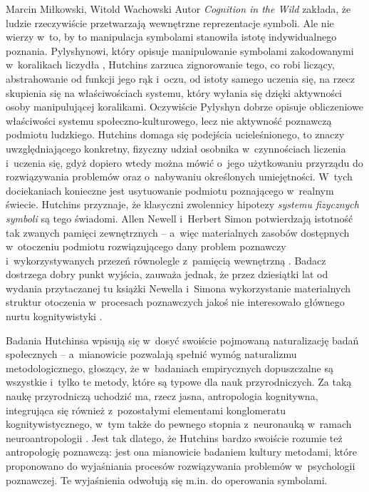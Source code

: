 \begin{artplenv2auth}{Marcin Miłkowski, Witold Wachowski}
Autor \textit{Cognition in the Wild} zakłada, że ludzie rzeczywiście przetwarzają wewnętrzne reprezentacje symboli. Ale nie wierzy w~to, by to manipulacja symbolami stanowiła istotę indywidualnego poznania. Pylyshynowi, który opisuje manipulowanie symbolami zakodowanymi w~koralikach liczydła
\parencite[][s.~56]{pylyshyn_computing_1989}, %
 Hutchins zarzuca zignorowanie tego, co robi liczący, abstrahowanie od funkcji jego rąk i~oczu, od istoty samego uczenia się, na rzecz skupienia się na właściwościach systemu, który wyłania się dzięki aktywności osoby manipulującej koralikami. Oczywiście Pylyshyn dobrze opisuje obliczeniowe właściwości systemu społeczno-kulturowego, lecz nie aktywność poznawczą podmiotu ludzkiego. Hutchins domaga się podejścia ucieleśnionego, to znaczy uwzględniającego konkretny, fizyczny udział osobnika w~czynnościach liczenia i~uczenia się, gdyż dopiero wtedy można mówić o~jego użytkowaniu przyrządu do rozwiązywania problemów oraz o~nabywaniu określonych umiejętności. W~tych dociekaniach konieczne jest usytuowanie podmiotu poznającego w~realnym świecie. Hutchins przyznaje, że klasyczni zwolennicy hipotezy \textit{systemu fizycznych symboli} są tego świadomi. Allen Newell i~Herbert Simon potwierdzają istotność tak zwanych pamięci zewnętrznych -- a~więc materialnych zasobów dostępnych w~otoczeniu podmiotu rozwiązującego dany problem poznawczy i~wykorzystywanych przezeń równolegle z~pamięcią wewnętrzną 
\parencite[][s.~800–803]{newell_human_1972}. %
 Badacz dostrzega dobry punkt wyjścia, zauważa jednak, że przez dziesiątki lat od wydania przytaczanej tu książki Newella i~Simona wykorzystanie materialnych struktur otoczenia w~procesach poznawczych jakoś nie interesowało głównego nurtu kognitywistyki 
\parencites[][]{dahlback_perspective_2016}[][s.~364–370]{hutchins_cognition_1995}.%


Badania Hutchinsa wpisują się w~dosyć swoiście pojmowaną naturalizację badań społecznych -- a~mianowicie pozwalają spełnić wymóg naturalizmu metodologicznego, głoszący, że w~badaniach empirycznych
dopuszczalne są wszystkie i~tylko te metody, które są typowe dla nauk przyrodniczych. Za taką naukę przyrodniczą uchodzić ma, rzecz jasna, antropologia kognitywna, integrująca się również z~pozostałymi elementami konglomeratu kognitywistycznego, w~tym także do pewnego stopnia z~neuronauką w~ramach neuroantropologii
\parencite[][]{lende_encultured_2012}. %
 Jest tak dlatego, że Hutchins bardzo swoiście rozumie też antropologię poznawczą: jest ona mianowicie badaniem kultury metodami, które proponowano do wyjaśniania procesów rozwiązywania problemów w~psychologii poznawczej. Te wyjaśnienia odwołują się m.in. do operowania symbolami.


\end{artplenv2auth}
